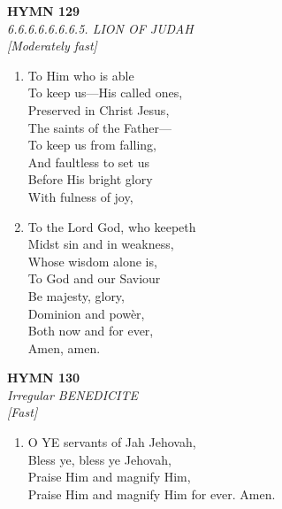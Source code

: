 \newpage
\begin{center}
    {\Large \textbf{HYMN 129}}
    \\
    \textit{6.6.6.6.6.6.6.5. LION OF JUDAH}
    \\
    \textit{\small [Moderately fast]}
\end{center}
\vspace{1em}

\begin{enumerate}
    \item To Him who is able \\
        To keep us---His called ones, \\
        Preserved in Christ Jesus, \\
        The saints of the Father--- \\
        To keep us from falling, \\
        And faultless to set us \\
        Before His bright glory \\
        With fulness of joy,

    \item To the Lord God, who keepeth \\
        Midst sin and in weakness, \\
        Whose wisdom alone is, \\
        To God and our Saviour \\
        Be majesty, glory, \\
        Dominion and pow\`er, \\
        Both now and for ever, \\
        Amen, amen.

\end{enumerate}

\newpage
\begin{center}
    {\Large \textbf{HYMN 130}}
    \\
    \textit{Irregular BENEDICITE}
    \\
    \textit{\small [Fast]}
\end{center}
\vspace{1em}

\begin{enumerate}
    \item O YE servants of Jah Jehovah, \\
        Bless ye, bless ye Jehovah, \\
        Praise Him and magnify Him, \\
        Praise Him and magnify Him for ever. Amen.

\end{enumerate}

